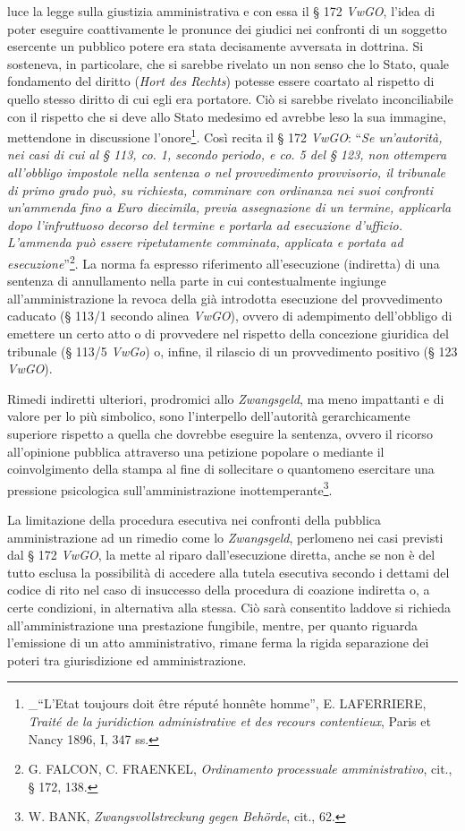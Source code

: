 \documentclass[12pt,it,a4paper,]{report}
\begin{document}
luce la legge sulla giustizia amministrativa e con essa il § 172
\emph{VwGO}, l'idea di poter eseguire coattivamente le pronunce dei
giudici nei confronti di un soggetto esercente un pubblico potere era
stata decisamente avversata in dottrina. Si sosteneva, in particolare,
che si sarebbe rivelato un non senso che lo Stato, quale fondamento del
diritto (\emph{Hort des Rechts}) potesse essere coartato al rispetto di
quello stesso diritto di cui egli era portatore. Ciò si sarebbe rivelato
inconciliabile con il rispetto che si deve allo Stato medesimo ed
avrebbe leso la sua immagine, mettendone in discussione
l'onore\footnote{\_``L'Etat toujours doit être réputé honnête homme'',
  E. LAFERRIERE, \emph{Traité de la juridiction administrative et des
  recours contentieux}, Paris et Nancy 1896, I, 347 ss.}. Così recita il
§ 172 \emph{VwGO}: ``\emph{Se un'autorità, nei casi di cui al § 113, co.
1, secondo periodo, e co. 5 del § 123, non ottempera all'obbligo
impostole nella sentenza o nel provvedimento provvisorio, il tribunale
di primo grado può, su richiesta, comminare con ordinanza nei suoi
confronti un'ammenda fino a Euro diecimila, previa assegnazione di un
termine, applicarla dopo l'infruttuoso decorso del termine e portarla ad
esecuzione d'ufficio. L'ammenda può essere ripetutamente comminata,
applicata e portata ad esecuzione}''\footnote{G. FALCON, C. FRAENKEL,
  \emph{Ordinamento processuale amministrativo}, cit., § 172, 138.}. La
norma fa espresso riferimento all'esecuzione (indiretta) di una sentenza
di annullamento nella parte in cui contestualmente ingiunge
all'amministrazione la revoca della già introdotta esecuzione del
provvedimento caducato (§ 113/1 secondo alinea \emph{VwGO}), ovvero di
adempimento dell'obbligo di emettere un certo atto o di provvedere nel
rispetto della concezione giuridica del tribunale (§ 113/5 \emph{VwGo})
o, infine, il rilascio di un provvedimento positivo (§ 123 \emph{VwGO}).

Rimedi indiretti ulteriori, prodromici allo \emph{Zwangsgeld}, ma meno
impattanti e di valore per lo più simbolico, sono l'interpello
dell'autorità gerarchicamente superiore rispetto a quella che dovrebbe
eseguire la sentenza, ovvero il ricorso all'opinione pubblica attraverso
una petizione popolare o mediante il coinvolgimento della stampa al fine
di sollecitare o quantomeno esercitare una pressione psicologica
sull'amministrazione inottemperante\footnote{W. BANK,
  \emph{Zwangsvollstreckung gegen Behörde}, cit., 62.}.

La limitazione della procedura esecutiva nei confronti della pubblica
amministrazione ad un rimedio come lo \emph{Zwangsgeld}, perlomeno nei
casi previsti dal § 172 \emph{VwGO}, la mette al riparo dall'esecuzione
diretta, anche se non è del tutto esclusa la possibilità di accedere
alla tutela esecutiva secondo i dettami del codice di rito nel caso di
insuccesso della procedura di coazione indiretta o, a certe condizioni,
in alternativa alla stessa. Ciò sarà consentito laddove si richieda
all'amministrazione una prestazione fungibile, mentre, per quanto
riguarda l'emissione di un atto amministrativo, rimane ferma la rigida
separazione dei poteri tra giurisdizione ed amministrazione.
\end{document}
